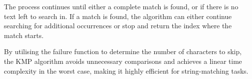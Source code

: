 The process continues until either a complete match is found, or if there is no text left to search in. If a match is found, the algorithm can either continue searching for additional occurrences or stop and return the index where the match starts.

By utilising the failure function to determine the number of characters to skip, the KMP algorithm avoids unnecessary comparisons and achieves a linear time complexity in the worst case, making it highly efficient for string-matching tasks.
